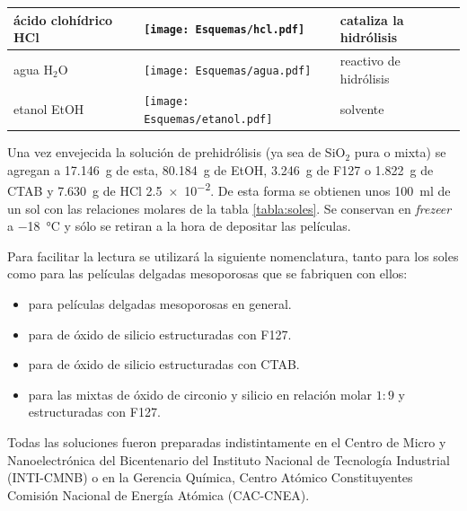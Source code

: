 \begin{table}[ht!]
\begin{tabular}{>{\raggedright\arraybackslash}m{2.40cm}>{\centering\arraybackslash}m{4cm}>{\centering\arraybackslash}m{2.35cm}>{\raggedright\arraybackslash}m{1.7cm}}
				  		  ácido clohídrico HCl& \texttt{[image: Esquemas/hcl.pdf]}  & \multirow{1}{*}{$36,46$}   & cataliza la hidrólisis \\ \midrule
				  		  agua \hspace{2cm} H$_2$O  &  \texttt{[image: Esquemas/agua.pdf]}  & \multirow{1}{*}{$18,02$}   & reactivo de hidrólisis \\ \midrule
				  		  etanol \hspace{2cm} EtOH  & \texttt{[image: Esquemas/etanol.pdf]}  & \multirow{1}{*}{$46,07$}   & solvente \\ 
				  		  \bottomrule
				    	  \end{tabular}
				   		  \label{tabla:reactivos}
					      \end{table}

			Una vez envejecida la solución de prehidrólisis (ya sea de SiO$_2$ pura o mixta) se agregan a \SI{17.146}{\gram} de esta, \SI{80.184}{\gram} de EtOH, \SI{3.246}{\gram} de F127 o \SI{1.822}{\gram} de CTAB y \SI{7.630}{\gram} de HCl \SI{2,5e-2}{\Molar}. De esta forma se obtienen unos \SI{100}{\ml} de un sol con las relaciones molares de la tabla \ref{tabla:soles}. Se conservan en \textit{frezeer} a \SI{-18}{\celsius} y sólo se retiran a la hora de depositar las películas. 

			Para facilitar la lectura se utilizará la siguiente nomenclatura, tanto para los soles como para las películas delgadas mesoporosas que se fabriquen con ellos: 

				\begin{itemize}
			 			\item \pdm\space para películas delgadas mesoporosas en general.
			 			\item \pdmF\space para \pdm\space de óxido de silicio estructuradas con F127. 
			 			\item \pdmC\space para \pdm\space de óxido de silicio estructuradas con CTAB.
			 			\item \pdmZ\space para las \pdm\space mixtas de óxido de circonio y silicio en relación molar $1\!:\!9$ y estructuradas con F127. 
					    \end{itemize}	
			
			Todas las soluciones fueron preparadas indistintamente en el Centro de Micro y Nanoelectrónica del Bicentenario del Instituto Nacional de Tecnología Industrial (INTI-CMNB) o en la Gerencia Química, Centro Atómico Constituyentes Comisión Nacional de Energía Atómica (CAC-CNEA). 
					
